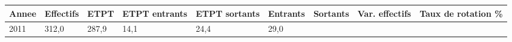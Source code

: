 \begin{longtable}[]{@{}lllllllll@{}}
\toprule
\begin{minipage}[b]{0.05\columnwidth}\raggedright
Annee\strut
\end{minipage} & \begin{minipage}[b]{0.08\columnwidth}\raggedright
Effectifs\strut
\end{minipage} & \begin{minipage}[b]{0.05\columnwidth}\raggedright
ETPT\strut
\end{minipage} & \begin{minipage}[b]{0.10\columnwidth}\raggedright
ETPT entrants\strut
\end{minipage} & \begin{minipage}[b]{0.10\columnwidth}\raggedright
ETPT sortants\strut
\end{minipage} & \begin{minipage}[b]{0.07\columnwidth}\raggedright
Entrants\strut
\end{minipage} & \begin{minipage}[b]{0.07\columnwidth}\raggedright
Sortants\strut
\end{minipage} & \begin{minipage}[b]{0.11\columnwidth}\raggedright
Var. effectifs\strut
\end{minipage} & \begin{minipage}[b]{0.14\columnwidth}\raggedright
Taux de rotation \%\strut
\end{minipage}\tabularnewline
\midrule
\endhead
\begin{minipage}[t]{0.05\columnwidth}\raggedright
2011\strut
\end{minipage} & \begin{minipage}[t]{0.08\columnwidth}\raggedright
312,0\strut
\end{minipage} & \begin{minipage}[t]{0.05\columnwidth}\raggedright
287,9\strut
\end{minipage} & \begin{minipage}[t]{0.10\columnwidth}\raggedright
14,1\strut
\end{minipage} & \begin{minipage}[t]{0.10\columnwidth}\raggedright
24,4\strut
\end{minipage} & \begin{minipage}[t]{0.07\columnwidth}\raggedright
29,0\strut
\end{minipage} & \begin{minipage}[t]{0.07\columnwidth}\raggedright

\end{minipage}
\end{longtable}
